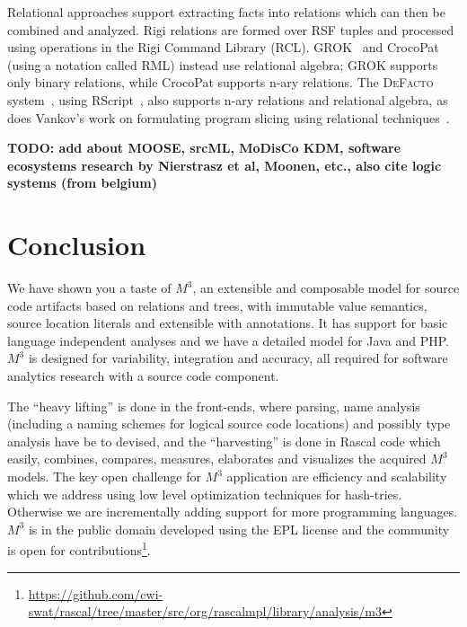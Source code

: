 \documentclass[conference]{IEEEtran}
\newcommand{\Rascal}{\textsc{Rascal}}
\newcommand{\DeFacto}{\textsc{DeFacto}\xspace}
\newcommand{\mthree}{\ensuremath{M^3}\xspace}
\begin{document}
Relational approaches support extracting facts into relations which can then
be combined and analyzed. Rigi relations are formed over RSF tuples and
processed using operations in the Rigi Command Library (RCL).
GROK~\cite{Holt96} and CrocoPat~\cite{BeyerEtAl03,beyer05efficient} (using a
notation called RML) instead use relational algebra; GROK supports only binary
relations, while CrocoPat supports n-ary relations. The \DeFacto
system~\cite{DBLP:conf/sle/BastenK08}, using RScript~\cite{KlintRscript}, also
supports n-ary relations and relational algebra, as does Vankov's work on
formulating program slicing using relational techniques~\cite{Vankov05}.

\textbf{TODO: add about MOOSE, srcML, MoDisCo KDM, software ecosystems research by Nierstrasz et al, Moonen, etc., also cite logic systems (from belgium)}

\section{Conclusion}

We have shown you a taste of \mthree, an extensible and composable model for
source code artifacts based on relations and trees, with immutable value
semantics, source location literals and extensible with annotations. It has
support for basic language independent analyses and we have a detailed model
for Java and PHP. \mthree is designed for variability, integration and accuracy, all required for software analytics research with a source code component.

The ``heavy lifting'' is done in the front-ends, where parsing, name analysis (including a naming schemes for logical source code locations) and possibly type analysis have be to devised, and the ``harvesting'' is done in Rascal code which easily, combines, compares, measures, elaborates and visualizes the acquired \mthree models. The key open challenge for \mthree application are efficiency and scalability which we address using low level optimization techniques for hash-tries. Otherwise we are incrementally adding support for more programming languages. \mthree is in the public domain developed using the EPL license and the community is open for contributions\footnote{\url{https://github.com/cwi-swat/rascal/tree/master/src/org/rascalmpl/library/analysis/m3}}.



\end{document}
